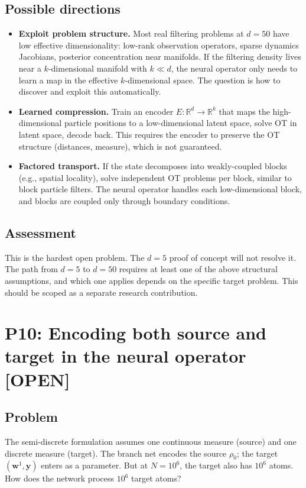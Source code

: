 \documentclass[11pt]{article}
\newcommand{\RR}{\mathbb{R}}
\newcommand{\bw}{\mathbf{w}}
\newcommand{\by}{\mathbf{y}}
\newcommand{\statusopen}{\textcolor{open}{\textbf{[OPEN]}}}
\begin{document}
\subsection*{Possible directions}
\begin{itemize}[nosep,leftmargin=1.5em]
    \item \textbf{Exploit problem structure.} Most real filtering problems at $d = 50$ have low effective dimensionality: low-rank observation operators, sparse dynamics Jacobians, posterior concentration near manifolds. If the filtering density lives near a $k$-dimensional manifold with $k \ll d$, the neural operator only needs to learn a map in the effective $k$-dimensional space. The question is how to discover and exploit this automatically.
    \item \textbf{Learned compression.} Train an encoder $E: \RR^d \to \RR^k$ that maps the high-dimensional particle positions to a low-dimensional latent space, solve OT in latent space, decode back. This requires the encoder to preserve the OT structure (distances, measure), which is not guaranteed.
    \item \textbf{Factored transport.} If the state decomposes into weakly-coupled blocks (e.g., spatial locality), solve independent OT problems per block, similar to block particle filters. The neural operator handles each low-dimensional block, and blocks are coupled only through boundary conditions.
\end{itemize}

\subsection*{Assessment}
This is the hardest open problem. The $d = 5$ proof of concept will not resolve it. The path from $d = 5$ to $d = 50$ requires at least one of the above structural assumptions, and which one applies depends on the specific target problem. This should be scoped as a separate research contribution.

\section{P10: Encoding both source and target in the neural operator \statusopen}

\subsection*{Problem}
The semi-discrete formulation assumes one continuous measure (source) and one discrete measure (target). The branch net encodes the source $\rho_0$; the target $(\bw^1, \by)$ enters as a parameter. But at $N = 10^6$, the target also has $10^6$ atoms. How does the network process $10^6$ target atoms?
\end{document}
